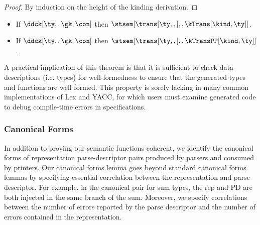 \begin{proof}
  By induction on the height of the kinding derivation.
\end{proof}

\begin{theorem}
  \begin{itemize}
  \item If $\ddck[\ty,,\gk,\con]$ then
    $\stsem[{\trans[\ty,,]},,\kTrans[\kind,\ty]]$.
  \item If $\ddck[\ty,,\gk,\con]$ then
    $\stsem[{\trans[\ty,,]},,\kTransPP[\kind,\ty]]$.
  \end{itemize}  
\end{theorem}

A practical implication of this theorem is that
it is sufficient to check data descriptions (i.e. \ddc{} types) for
well-formedness to ensure that the generated types and
functions are well formed. This property is sorely lacking in many
common implementations of Lex and YACC, for which users must examine
generated code to debug compile-time errors in
specifications.

\subsubsection{Canonical Forms}

In addition to proving our semantic functions coherent, we identify
the canonical forms of representation parse-descriptor pairs
produced by parsers and consumed by printers. Our canonical forms
lemma goes beyond standard canonical forms lemmas by specifying
essential correlation between the representation and parse
descriptor. For example, in the canonical pair for sum types, the rep
and PD are both injected in the same branch of the sum. Moreover, we
specify correlations between the number of errors reported by the
parse descriptor and the number of errors contained in the representation.




